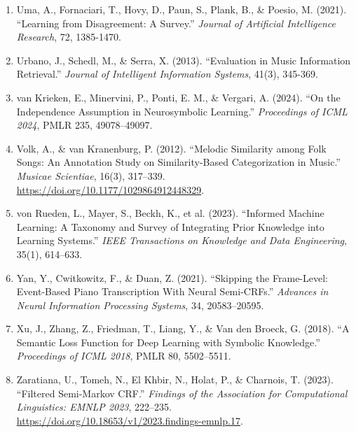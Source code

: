 \documentclass[11pt,a4paper]{article}
\begin{document}
\begin{enumerate}
\item
 Uma, A., Fornaciari, T., Hovy, D., Paun, S., Plank, B., \& Poesio, M. (2021). ``Learning from Disagreement: A Survey.'' \emph{Journal of Artificial Intelligence Research}, 72, 1385-1470.
\item
 Urbano, J., Schedl, M., \& Serra, X. (2013). ``Evaluation in Music Information Retrieval.'' \emph{Journal of Intelligent Information Systems}, 41(3), 345-369.
\item
 van Krieken, E., Minervini, P., Ponti, E. M., \& Vergari, A. (2024). ``On the Independence Assumption in Neurosymbolic Learning.'' \emph{Proceedings of ICML 2024}, PMLR 235, 49078--49097.
\item
 Volk, A., \& van Kranenburg, P. (2012). ``Melodic Similarity among Folk Songs: An Annotation Study on Similarity-Based Categorization in Music.'' \emph{Musicae Scientiae}, 16(3), 317--339. \url{https://doi.org/10.1177/1029864912448329}.
\item
 von Rueden, L., Mayer, S., Beckh, K., et al. (2023). ``Informed Machine Learning: A Taxonomy and Survey of Integrating Prior Knowledge into Learning Systems.'' \emph{IEEE Transactions on Knowledge and Data Engineering}, 35(1), 614--633.
\item
 Yan, Y., Cwitkowitz, F., \& Duan, Z. (2021). ``Skipping the Frame-Level: Event-Based Piano Transcription With Neural Semi-CRFs.'' \emph{Advances in Neural Information Processing Systems}, 34, 20583--20595.
\item
 Xu, J., Zhang, Z., Friedman, T., Liang, Y., \& Van den Broeck, G. (2018). ``A Semantic Loss Function for Deep Learning with Symbolic Knowledge.'' \emph{Proceedings of ICML 2018}, PMLR 80, 5502--5511.
\item
 Zaratiana, U., Tomeh, N., El Khbir, N., Holat, P., \& Charnois, T. (2023). ``Filtered Semi-Markov CRF.'' \emph{Findings of the Association for Computational Linguistics: EMNLP 2023}, 222--235. \url{https://doi.org/10.18653/v1/2023.findings-emnlp.17}.
\end{enumerate}


\endgroup
\end{document}
